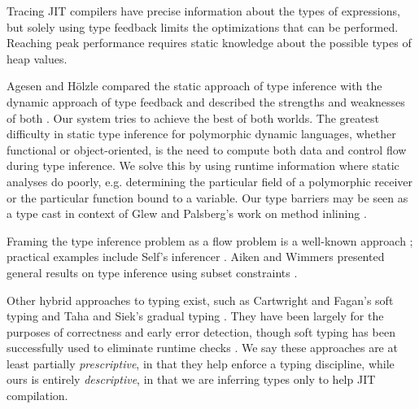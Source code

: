 Tracing JIT compilers \cite{GalVEE09, GalPLDI09}
have precise information about the types of expressions,
but solely using type feedback limits the optimizations that can
be performed.
Reaching peak performance requires static knowledge about
the possible types of heap values.

Agesen and H\"olzle compared the static approach of type inference with the
dynamic approach of type feedback and described the strengths and weaknesses
of both \cite{Agesen95}. Our system tries to achieve the best of both
worlds. The greatest difficulty in static type inference for polymorphic
dynamic languages, whether functional or object-oriented, is the need to
compute both data and control flow during type inference. We solve this by
using runtime information where static analyses do poorly,
e.g. determining the particular field of a polymorphic receiver or the
particular function bound to a variable. Our type barriers may be seen as a
type cast in context of Glew and
Palsberg's work on method inlining \cite{Glew02}.

Framing the type inference problem as a flow problem is a well-known approach
\cite{Oxhoj92, Palsberg91}; practical examples include Self's inferencer
\cite{Agesen93TI}.
Aiken and Wimmers presented general results on
type inference using subset constraints \cite{Aiken93}.


Other hybrid approaches to typing exist, such as Cartwright and Fagan's soft
typing and Taha and Siek's gradual typing \cite{Cartwright91, Siek07}. They
have been largely for the purposes of correctness and early error
detection, though soft typing has been successfully used to eliminate runtime checks \cite{Wright97}.
We say these approaches are at least partially \emph{prescriptive}, in that they
help enforce a typing discipline, while ours is entirely \emph{descriptive}, in that
we are inferring types only to help JIT compilation.



